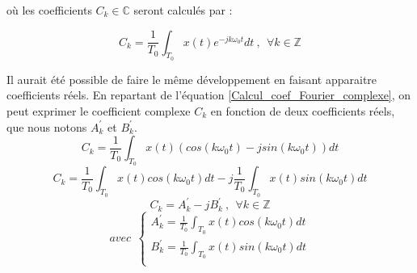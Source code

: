 	où les coefficients $C_{k} \in \mathbb{C}$ seront calculés par :
	
	\begin{equation}\label{Calcul_coef_Fourier_complexe}
	C_{k}=\frac{1}{T_{0}}\int_{T_{0}}x(t)e^{-jk\omega_{0}t}dt~,~~\forall k \in \mathbb{Z}
	\end{equation}
	 

	Il aurait été possible de faire le même développement en faisant apparaitre coefficients réels. En repartant de l'équation \ref{Calcul_coef_Fourier_complexe}, on peut exprimer le coefficient complexe $C_{k}$ en fonction de deux coefficients réels, que nous notons $A_{k}^{'}$ et $B_{k}^{'}$.
	\begin{equation*}
	C_{k}=\frac{1}{T_{0}}\int_{T_{0}}x(t)(cos(k\omega_{0}t)-jsin(k\omega_{0}t))dt
	\end{equation*}
	\begin{equation*}
	C_{k}=\frac{1}{T_{0}}\int_{T_{0}}x(t)cos(k\omega_{0}t)dt-j\frac{1}{T_{0}}\int_{T_{0}}x(t)sin(k\omega_{0}t)dt
	\end{equation*}
	\begin{equation*}
	C_{k}=A_{k}^{'}-jB_{k}^{'}~,~~\forall k \in \mathbb{Z}
	\end{equation*}
	\begin{equation*}
	avec~~\left \{
	\begin{array}{l}
	A_{k}^{'}=\frac{1}{T_{0}}\int_{T_{0}}x(t)cos(k\omega_{0}t)dt\\
	B_{k}^{'}=\frac{1}{T_{0}}\int_{T_{0}}x(t)sin(k\omega_{0}t)dt \\
	\end{array}
	\right .
	\end{equation*}
	
